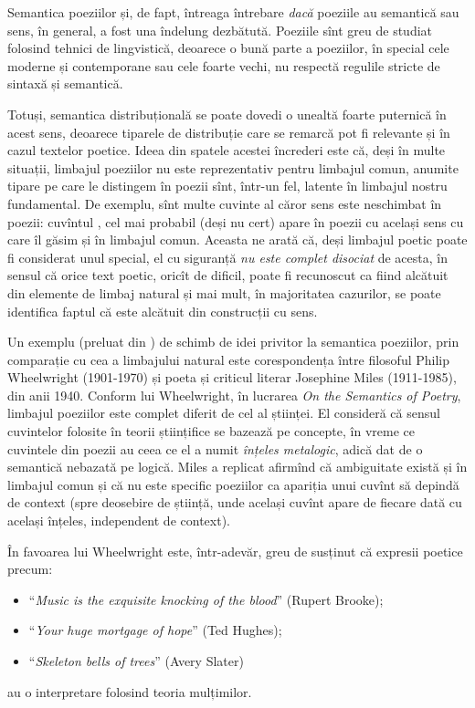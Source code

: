 Semantica poeziilor și, de fapt, întreaga întrebare \emph{dacă} poeziile
au semantică sau sens, în general, a fost una îndelung dezbătută. Poeziile
sînt greu de studiat folosind tehnici de lingvistică, deoarece o bună parte
a poeziilor, în special cele moderne și contemporane sau cele foarte vechi,
nu respectă regulile stricte de sintaxă și semantică.

Totuși, semantica distribuțională se poate dovedi o unealtă foarte puternică în
acest sens, deoarece tiparele de distribuție care se remarcă pot fi relevante
și în cazul textelor poetice. Ideea din spatele acestei încrederi este că,
deși în multe situații, limbajul poeziilor nu este reprezentativ pentru
limbajul comun, anumite tipare pe care le distingem în poezii sînt, într-un fel,
latente în limbajul nostru fundamental. De exemplu, sînt multe cuvinte al
căror sens este neschimbat în poezii: cuvîntul , cel mai probabil
(deși nu cert) apare în poezii cu același sens cu care îl găsim și în
limbajul comun. Aceasta ne arată că, deși limbajul poetic poate fi considerat
unul special, el cu siguranță \emph{nu este complet disociat} de acesta, în
sensul că orice text poetic, oricît de dificil, poate fi recunoscut ca fiind
alcătuit din elemente de limbaj natural și mai mult, în majoritatea cazurilor,
se poate identifica faptul că este alcătuit din construcții cu sens.

Un exemplu (preluat din \cite{herbelot}) de schimb de idei privitor la semantica
poeziilor, prin comparație cu cea a limbajului natural este corespondența
între filosoful Philip Wheelwright (1901-1970) și poeta și criticul literar
Josephine Miles (1911-1985), din anii 1940. Conform lui Wheelwright, în lucrarea
\emph{On the Semantics of Poetry}, limbajul poeziilor este complet diferit de
cel al științei. El consideră că sensul cuvintelor folosite în teorii științifice
se bazează pe concepte, în vreme ce cuvintele din poezii au ceea ce el a numit
\emph{înțeles metalogic}, adică dat de o semantică nebazată pe logică.
Miles a replicat afirmînd că ambiguitate există și în limbajul comun și că nu
este specific poeziilor ca apariția unui cuvînt să depindă de context (spre
deosebire de știință, unde același cuvînt apare de fiecare dată cu același
înțeles, independent de context).

În favoarea lui Wheelwright este, într-adevăr, greu de susținut că expresii
poetice precum:
\begin{itemize}
\item ``{\emph{Music is the exquisite knocking of the blood}}'' (Rupert Brooke);
\item ``\emph{Your huge mortgage of hope}'' (Ted Hughes);
\item ``\emph{Skeleton bells of trees}'' (Avery Slater)
\end{itemize}
au o interpretare folosind teoria mulțimilor.

